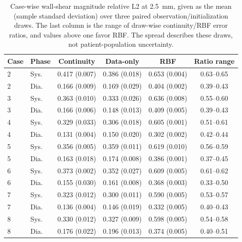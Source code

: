 \begin{table}[htbp]
\centering
\small
\caption{Case-wise wall-shear magnitude relative L2 at 2.5~mm, given as the mean (sample standard deviation) over three paired observation/initialization draws. The last column is the range of draw-wise continuity/RBF error ratios, and values above one favor RBF. The spread describes these draws, not patient-population uncertainty.}
\label{tab:case_shear}
\begin{tabular}{llcccc}
\toprule
Case & Phase & Continuity & Data-only & RBF & Ratio range \\
\midrule
2 & Sys. & 0.417 (0.007) & 0.386 (0.018) & 0.653 (0.004) & 0.63--0.65 \\
2 & Dia. & 0.166 (0.009) & 0.169 (0.029) & 0.404 (0.002) & 0.39--0.43 \\
3 & Sys. & 0.363 (0.010) & 0.333 (0.026) & 0.636 (0.008) & 0.55--0.60 \\
3 & Dia. & 0.166 (0.006) & 0.148 (0.013) & 0.409 (0.005) & 0.39--0.43 \\
4 & Sys. & 0.329 (0.033) & 0.306 (0.018) & 0.605 (0.001) & 0.51--0.61 \\
4 & Dia. & 0.131 (0.004) & 0.150 (0.020) & 0.302 (0.002) & 0.42--0.44 \\
5 & Sys. & 0.356 (0.005) & 0.359 (0.011) & 0.619 (0.010) & 0.56--0.59 \\
5 & Dia. & 0.163 (0.018) & 0.174 (0.008) & 0.386 (0.001) & 0.37--0.45 \\
6 & Sys. & 0.373 (0.002) & 0.352 (0.027) & 0.609 (0.005) & 0.61--0.62 \\
6 & Dia. & 0.155 (0.030) & 0.161 (0.008) & 0.368 (0.003) & 0.33--0.50 \\
7 & Sys. & 0.323 (0.012) & 0.300 (0.011) & 0.590 (0.005) & 0.53--0.57 \\
7 & Dia. & 0.136 (0.004) & 0.146 (0.019) & 0.332 (0.005) & 0.40--0.43 \\
8 & Sys. & 0.330 (0.012) & 0.327 (0.009) & 0.598 (0.005) & 0.54--0.58 \\
8 & Dia. & 0.176 (0.022) & 0.196 (0.013) & 0.374 (0.005) & 0.40--0.51 \\
\bottomrule
\end{tabular}
\end{table}
